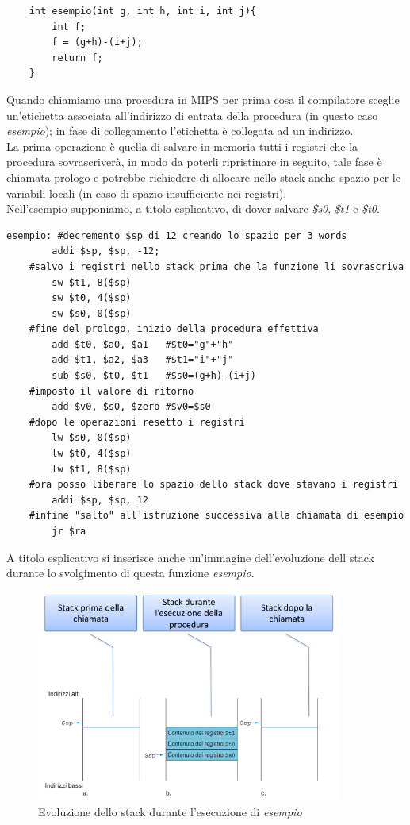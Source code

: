 \documentclass[class=book, crop=false]{standalone}
\begin{document}
\begin{verbatim}
	int esempio(int g, int h, int i, int j){
		int f;
		f = (g+h)-(i+j);
		return f;
	}
\end{verbatim}

Quando chiamiamo una procedura in MIPS per prima cosa il compilatore sceglie un’etichetta associata all’indirizzo di entrata della procedura (in questo caso \emph{esempio}); in fase di collegamento l'etichetta è collegata ad un indirizzo.\\
La prima operazione è quella di salvare in memoria tutti i registri che la procedura sovrascriverà, in modo da poterli ripristinare in seguito, tale fase è chiamata prologo e potrebbe richiedere di allocare nello stack anche spazio per le variabili locali (in caso di spazio insufficiente nei registri).\\
Nell'esempio supponiamo, a titolo esplicativo, di dover salvare \emph{\$s0}, \emph{\$t1} e \emph{\$t0}.\\

\begin{verbatim}
esempio: #decremento $sp di 12 creando lo spazio per 3 words
		addi $sp, $sp, -12;
	#salvo i registri nello stack prima che la funzione li sovrascriva
		sw $t1, 8($sp)
		sw $t0, 4($sp)
		sw $s0, 0($sp)
	#fine del prologo, inizio della procedura effettiva
		add $t0, $a0, $a1	#$t0="g"+"h"
		add $t1, $a2, $a3	#$t1="i"+"j"
		sub $s0, $t0, $t1	#$s0=(g+h)-(i+j)
	#imposto il valore di ritorno
		add $v0, $s0, $zero #$v0=$s0
	#dopo le operazioni resetto i registri
		lw $s0, 0($sp)
		lw $t0, 4($sp)
		lw $t1, 8($sp)
	#ora posso liberare lo spazio dello stack dove stavano i registri
		addi $sp, $sp, 12
	#infine "salto" all'istruzione successiva alla chiamata di esempio
		jr $ra
\end{verbatim}

A titolo esplicativo si inserisce anche un'immagine dell'evoluzione dell stack durante lo svolgimento di questa funzione \emph{esempio}.

\begin{figure}[H]
	\centering
	\caption{Evoluzione dello stack durante l'esecuzione di \emph{esempio}}
	\includegraphics[width=0.9\textwidth,keepaspectratio]{Evoluzione-stack}
\end{figure}
\end{document}
